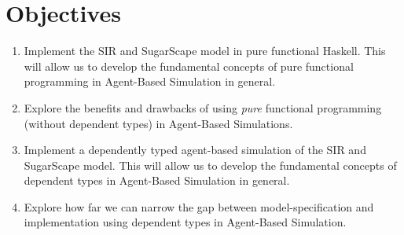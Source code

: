 \section{Objectives}
\begin{enumerate}
	\item Implement the SIR and SugarScape model in pure functional Haskell. This will allow us to develop the fundamental concepts of pure functional programming in Agent-Based Simulation in general.

	\item Explore the benefits and drawbacks of using \textit{pure} functional programming (without dependent types) in Agent-Based Simulations.

	\item Implement a dependently typed agent-based simulation of the SIR and SugarScape model. This will allow us to develop the fundamental concepts of dependent types in Agent-Based Simulation in general.

	\item Explore how far we can narrow the gap between model-specification and implementation using dependent types in Agent-Based Simulation.
\end{enumerate}